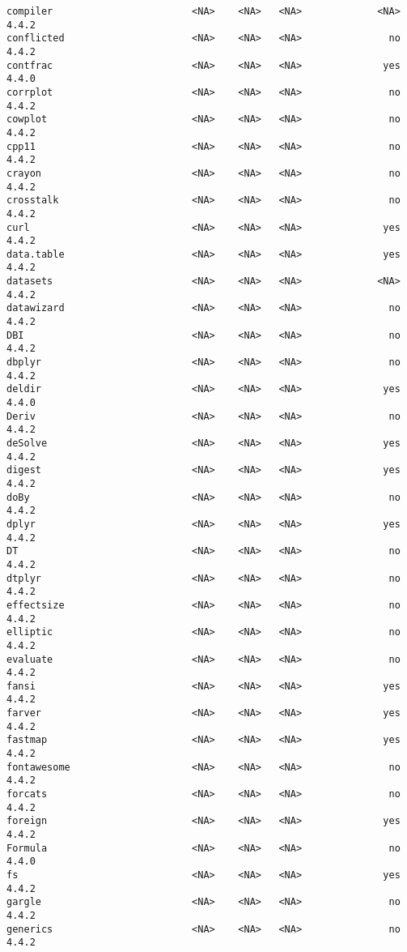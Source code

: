 \documentclass[
  letterpaper,
  DIV=11,
  numbers=noendperiod]{scrreprt}
\begin{document}
\begin{verbatim}
compiler                        <NA>    <NA>   <NA>             <NA> 4.4.2
conflicted                      <NA>    <NA>   <NA>               no 4.4.2
contfrac                        <NA>    <NA>   <NA>              yes 4.4.0
corrplot                        <NA>    <NA>   <NA>               no 4.4.2
cowplot                         <NA>    <NA>   <NA>               no 4.4.2
cpp11                           <NA>    <NA>   <NA>               no 4.4.2
crayon                          <NA>    <NA>   <NA>               no 4.4.2
crosstalk                       <NA>    <NA>   <NA>               no 4.4.2
curl                            <NA>    <NA>   <NA>              yes 4.4.2
data.table                      <NA>    <NA>   <NA>              yes 4.4.2
datasets                        <NA>    <NA>   <NA>             <NA> 4.4.2
datawizard                      <NA>    <NA>   <NA>               no 4.4.2
DBI                             <NA>    <NA>   <NA>               no 4.4.2
dbplyr                          <NA>    <NA>   <NA>               no 4.4.2
deldir                          <NA>    <NA>   <NA>              yes 4.4.0
Deriv                           <NA>    <NA>   <NA>               no 4.4.2
deSolve                         <NA>    <NA>   <NA>              yes 4.4.2
digest                          <NA>    <NA>   <NA>              yes 4.4.2
doBy                            <NA>    <NA>   <NA>               no 4.4.2
dplyr                           <NA>    <NA>   <NA>              yes 4.4.2
DT                              <NA>    <NA>   <NA>               no 4.4.2
dtplyr                          <NA>    <NA>   <NA>               no 4.4.2
effectsize                      <NA>    <NA>   <NA>               no 4.4.2
elliptic                        <NA>    <NA>   <NA>               no 4.4.2
evaluate                        <NA>    <NA>   <NA>               no 4.4.2
fansi                           <NA>    <NA>   <NA>              yes 4.4.2
farver                          <NA>    <NA>   <NA>              yes 4.4.2
fastmap                         <NA>    <NA>   <NA>              yes 4.4.2
fontawesome                     <NA>    <NA>   <NA>               no 4.4.2
forcats                         <NA>    <NA>   <NA>               no 4.4.2
foreign                         <NA>    <NA>   <NA>              yes 4.4.2
Formula                         <NA>    <NA>   <NA>               no 4.4.0
fs                              <NA>    <NA>   <NA>              yes 4.4.2
gargle                          <NA>    <NA>   <NA>               no 4.4.2
generics                        <NA>    <NA>   <NA>               no 4.4.2

\end{verbatim}
\end{document}
